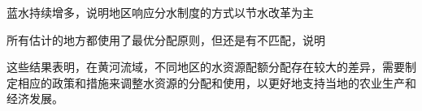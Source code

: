 蓝水持续增多，说明地区响应分水制度的方式以节水改革为主

所有估计的地方都使用了最优分配原则，但还是有不匹配，说明

这些结果表明，在黄河流域，不同地区的水资源配额分配存在较大的差异，需要制定相应的政策和措施来调整水资源的分配和使用，以更好地支持当地的农业生产和经济发展。

